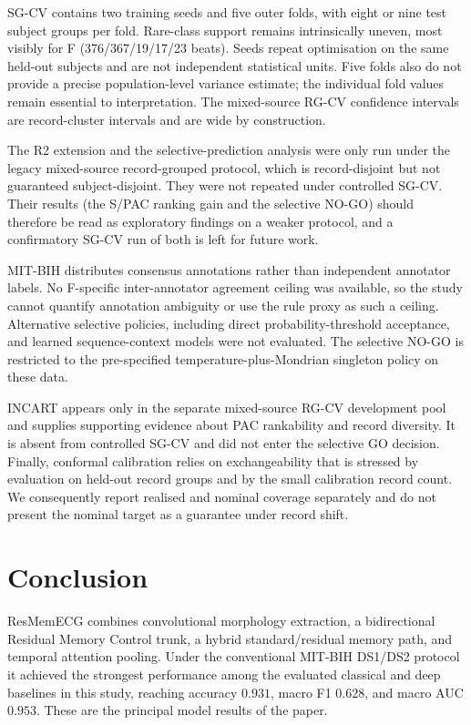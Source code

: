 \documentclass[pdflatex,sn-mathphys-num]{sn-jnl}
\begin{document}
SG-CV contains two training seeds and five outer folds, with eight or nine test
subject groups per fold. Rare-class support remains intrinsically uneven, most
visibly for F (376/367/19/17/23 beats). Seeds repeat optimisation on the same
held-out subjects and are not independent statistical units. Five folds also do
not provide a precise population-level variance estimate; the individual fold
values remain essential to interpretation. The mixed-source RG-CV confidence
intervals are record-cluster intervals and are wide by construction.

The R2 extension and the selective-prediction analysis were only run under the
legacy mixed-source record-grouped protocol, which is record-disjoint but not
guaranteed subject-disjoint. They were not repeated under controlled SG-CV. Their
results (the S/PAC ranking gain and the selective NO-GO) should therefore be read
as exploratory findings on a weaker protocol, and a confirmatory SG-CV run of
both is left for future work.

MIT-BIH distributes consensus annotations rather than independent annotator
labels. No F-specific inter-annotator agreement ceiling was available, so the
study cannot quantify annotation ambiguity or use the rule proxy as such a
ceiling. Alternative selective policies, including direct probability-threshold
acceptance, and learned sequence-context models were not evaluated. The
selective NO-GO is restricted to the pre-specified temperature-plus-Mondrian
singleton policy on these data.

INCART appears only in the separate mixed-source RG-CV development pool and
supplies supporting evidence about PAC rankability and record diversity. It is
absent from controlled SG-CV and did not enter the selective GO decision.
Finally, conformal calibration
relies on exchangeability that is stressed by evaluation on held-out record
groups and by the small calibration record count. We consequently report
realised and nominal coverage separately and do not present the nominal target
as a guarantee under record shift.

\section{Conclusion}
ResMemECG combines convolutional morphology extraction, a bidirectional
Residual Memory Control trunk, a hybrid standard/residual memory path, and
temporal attention pooling. Under the conventional MIT-BIH DS1/DS2 protocol it
achieved the strongest performance among the evaluated classical and deep baselines in this study,
reaching accuracy $0.931$, macro F1 $0.628$, and macro AUC $0.953$. These are the
principal model results of the paper.
\end{document}
